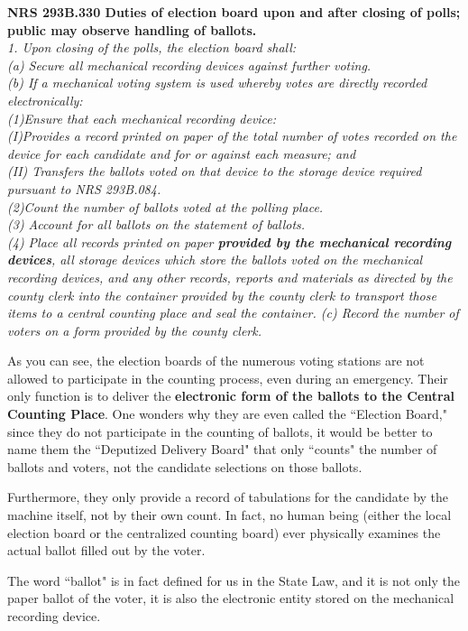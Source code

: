 \documentclass[preprint,13pt]{elsarticle}
\begin{document}
\textbf{ NRS 293B.330 Duties of election board upon and after closing of polls; public may observe handling of ballots.}\\
\textit{1. Upon closing of the polls, the election board shall:\\
(a) Secure all mechanical recording devices against further voting.\\
(b) If a mechanical voting system is used whereby votes are directly recorded electronically:\\
(1)Ensure that each mechanical recording device:\\
(I)Provides a record printed on paper of the total number of votes recorded on the device for each candidate and for or against each measure; and\\
(II) Transfers the ballots voted on that device to the storage device required pursuant to NRS 293B.084.\\
(2)Count the number of ballots voted at the polling place.\\
(3) Account for all ballots on the statement of ballots.\\
(4) Place all records printed on paper \textbf{provided by the mechanical recording devices}, all storage devices which store the ballots voted on the mechanical recording devices, and any other records, reports and materials as directed by the county clerk into the container provided by the county clerk to transport those items to a central counting place and seal the container.
 (c) Record the number of voters on a form provided by the county clerk.}

As you can see, the election boards of the numerous voting stations are not allowed to participate in the counting process, even during an emergency. Their only function is to deliver the \textbf{electronic form of the ballots to the Central Counting Place}. One wonders why they are even called the ``Election Board," since they do not participate in the counting of ballots, it would be better to name them the ``Deputized Delivery Board" that only ``counts" the number of ballots and voters, not the candidate selections on those ballots.

Furthermore, they only provide a record of tabulations for the candidate by the machine itself, not by their own count. In fact, no human being (either the local election board or the centralized counting board) ever physically examines the actual ballot filled out by the voter.

The word ``ballot" is in fact defined for us in the State Law, and it is not only the paper ballot of the voter, it is also the electronic entity stored on the mechanical recording device.
\end{document}
